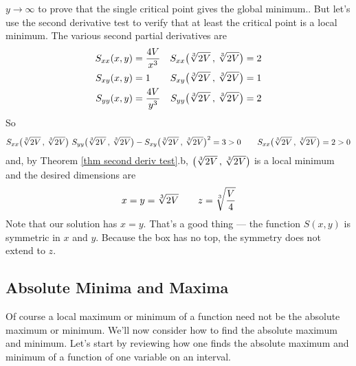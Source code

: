\begin{eg}
{$y\rightarrow\infty$ to prove that the single critical point gives the
global minimum.}. But let's use the second derivative test to verify that
at least the critical point is a local minimum. The various second partial derivatives are
\begin{align*}
S_{xx}(x,y)&=\frac{4V}{x^3} &
    S_{xx}\big(\root{3}\of{2V}\,,\,\root{3}\of{2V}\big)&=2 \\
S_{xy}(x,y)&=1&
    S_{xy}\big(\root{3}\of{2V}\,,\,\root{3}\of{2V}\big)&=1 \\
S_{yy}(x,y)&=\frac{4V}{y^3} &
    S_{yy}\big(\root{3}\of{2V}\,,\,\root{3}\of{2V}\big)&=2 
\end{align*}
So
\begin{align*}
S_{xx}\big(\root{3}\of{2V}\,,\,\root{3}\of{2V}\big)\ 
S_{yy}\big(\root{3}\of{2V}\,,\,\root{3}\of{2V}\big)
-S_{xy}\big(\root{3}\of{2V}\,,\,\root{3}\of{2V}\big)^2
=3>0\qquad
S_{xx}\big(\root{3}\of{2V}\,,\,\root{3}\of{2V}\big)=2>0
\end{align*}
and, by Theorem \ref{thm second deriv test}.b,
$\big(\root{3}\of{2V}\,,\,\root{3}\of{2V}\big)$ is a local 
minimum and the desired dimensions are
\begin{equation*}
x=y=\root{3}\of{2V}\qquad
z=\root{3}\of{\frac{V}{4}}
\end{equation*}
Note that our solution has $x=y$. That's a good thing --- the
function $S(x,y)$ is symmetric in $x$ and $y$. Because the box has
no top, the symmetry does not extend to $z$.
\end{eg} 



\subsection{Absolute Minima and Maxima}\label{sec global}


Of course a local maximum or minimum of a function need not be the 
absolute maximum or minimum. We'll now consider how to find the 
absolute maximum and minimum.
Let's start by reviewing how one finds the absolute maximum and minimum 
of a function of one variable on an interval. 

